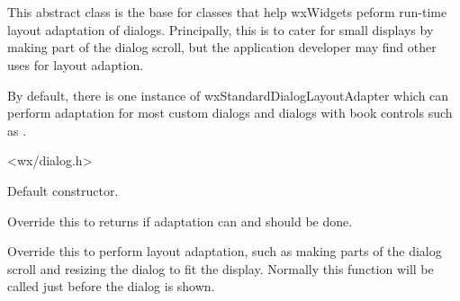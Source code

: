 \section{}\label{wxdialoglayoutadapter}

This abstract class is the base for classes that help wxWidgets peform run-time layout adaptation of dialogs. Principally,
this is to cater for small displays by making part of the dialog scroll, but the application developer may find other
uses for layout adaption.

By default, there is one instance of wxStandardDialogLayoutAdapter
which can perform adaptation for most custom dialogs and dialogs with book controls
such as .




<wx/dialog.h>







\label{wxdialoglayoutadapterctor}


Default constructor.

\label{wxdialoglayoutadaptercandolayoutadaptation}


Override this to returns \true if adaptation can and should be done.

\label{wxdialoglayoutadapterdolayoutadaptation}


Override this to perform layout adaptation, such as making parts of the dialog scroll and resizing the dialog to fit the display.
Normally this function will be called just before the dialog is shown.

